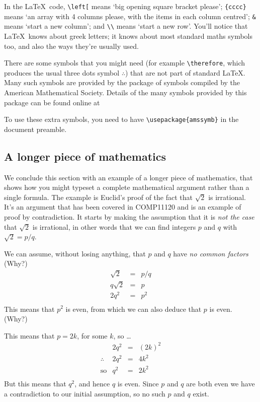 \begin{refsection}
In the \LaTeX\ code,  \verb|\left[| means `big opening square bracket please';  \verb|{cccc}| means `an array with 4 columns please, with the items in each column centred'; \verb|&| means `start a new column'; and \verb|\\| means `start a new row'. You'll notice that \LaTeX\ knows about  greek letters; it knows about most standard maths symbols too, and also the ways  they're usually used.

  There are some symbols that you might need (for example \verb+\therefore+, which produces the usual three dots symbol \(\therefore\)) that are not part of standard \LaTeX{}. Many such symbols are provided by the  package of symbols compiled by the American Mathematical Society. Details of the many symbols provided by this package can be found online at
  \begin{center}
  \end{center}
To use these extra symbols, you need to have \verb+\usepackage{amssymb}+ in the document preamble.


  \subsection{A longer piece of mathematics}
\label{sec:longer-piece-maths}

  We conclude this section with an example of a longer piece of mathematics, that shows how you might typeset a complete mathematical argument rather than a single formula. The example is Euclid's proof of the fact that $\sqrt{2}$ is irrational. It's an argument that has been covered in COMP11120 and is an example of proof by contradiction. It starts by making the assumption that it is \emph{not the case} that $\sqrt{2}$ is irrational, in other words that we can find integers $p$ and $q$ with $\sqrt{2} = p/q$.

  We can assume, without losing anything, that $p$ and $q$ have \emph{no common factors} (Why?)
  \[
  \begin{array}{lcl}
     \sqrt{2}    & = & p/q \\ 
      q\sqrt{2} & = & p   \\ 
      2q^2       & = & p^2 \\ 
  \end{array}
  \]
  This means that $p^2$ is even, from which we can also deduce that $p$ is even. (Why?)

  This means that $p = 2k$, for some $k$, so \ldots
  \[
  \begin{array}{llcl}
                       & 2q^2 & = & (2k)^2 \\ 
      \therefore & 2q^2 & = & 4k^2   \\ 
      \text{so}   & q^2   & = & 2k^2   \\
   \end{array}
  \]
  But this means that $q^2$, and hence $q$ is  even. Since $p$ and $q$ are both even we have a contradiction to our initial assumption, so no such $p$ and $q$ exist.


\end{refsection}

